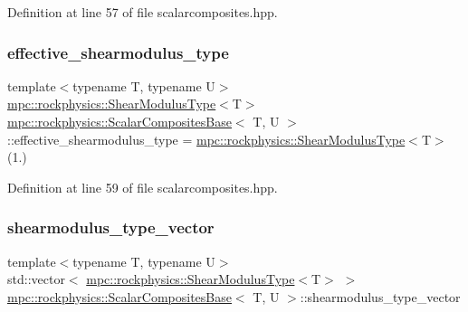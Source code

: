 Definition at line 57 of file scalarcomposites.\+hpp.

\mbox{\label{classmpc_1_1rockphysics_1_1_scalar_composites_base_a3d48702bd7ed14bd922f3e3991111d1b}} 
\subsubsection{\texorpdfstring{effective\+\_\+shearmodulus\+\_\+type}{effective\_shearmodulus\_type}}
{\footnotesize\ttfamily template$<$typename T, typename U$>$ \\
\mbox{\hyperlink{structmpc_1_1rockphysics_1_1_shear_modulus_type}{mpc\+::rockphysics\+::\+Shear\+Modulus\+Type}}$<$T$>$ \mbox{\hyperlink{classmpc_1_1rockphysics_1_1_scalar_composites_base}{mpc\+::rockphysics\+::\+Scalar\+Composites\+Base}}$<$ T, U $>$\+::effective\+\_\+shearmodulus\+\_\+type = \mbox{\hyperlink{structmpc_1_1rockphysics_1_1_shear_modulus_type}{mpc\+::rockphysics\+::\+Shear\+Modulus\+Type}}$<$T$>$(1.)\hspace{0.3cm}{\ttfamily [protected]}}



Definition at line 59 of file scalarcomposites.\+hpp.

\mbox{\label{classmpc_1_1rockphysics_1_1_scalar_composites_base_af6363e3a8cee280c18dbea704d70cf6a}} 
\subsubsection{\texorpdfstring{shearmodulus\+\_\+type\+\_\+vector}{shearmodulus\_type\_vector}}
{\footnotesize\ttfamily template$<$typename T, typename U$>$ \\
std\+::vector$<$ \mbox{\hyperlink{structmpc_1_1rockphysics_1_1_shear_modulus_type}{mpc\+::rockphysics\+::\+Shear\+Modulus\+Type}}$<$T$>$ $>$ \mbox{\hyperlink{classmpc_1_1rockphysics_1_1_scalar_composites_base}{mpc\+::rockphysics\+::\+Scalar\+Composites\+Base}}$<$ T, U $>$\+::shearmodulus\+\_\+type\+\_\+vector\hspace{0.3cm}{\ttfamily [protected]}}



